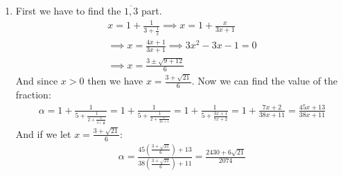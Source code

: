 \begin{enumerate}[label=]
    \item
        First we have to find the $\overline{1, 3}$ part.
        \begin{gather*}
            x = 1 + \frac{1}{3 + \frac{1}{x}} \implies x = 1 + \frac{x}{3x + 1} \\
            \implies x = \frac{4x + 1}{3x + 1} \implies 3x^2 - 3x - 1 = 0 \\
            \implies x = \frac{3 \pm \sqrt{9 + 12}}{6}
        \end{gather*}
        And since $x > 0$ then we have $x = \frac{3 + \sqrt{21}}{6}$. Now we can find the value of the fraction:
        \begin{gather*}
            \alpha = 1 + \frac{1}{5 + \frac{1}{2 + \frac{1}{3 + \frac{1}{x}}}} = 1 + \frac{1}{5 + \frac{1}{2 + \frac{x}{3x + 1}}} = 1 + \frac{1}{5 + \frac{3x + 1}{7x + 2}} = 1 + \frac{7x + 2}{38x + 11} = \frac{45x + 13}{38x + 11}
        \end{gather*}
        And if we let $x = \frac{3 + \sqrt{21}}{6}$:
        \begin{gather*}
            \alpha = \frac{45(\frac{3 + \sqrt{21}}{6}) + 13}{38(\frac{3 + \sqrt{21}}{6}) + 11} = \frac{2430 + 6\sqrt{21}}{2074}
        \end{gather*}
\end{enumerate}
